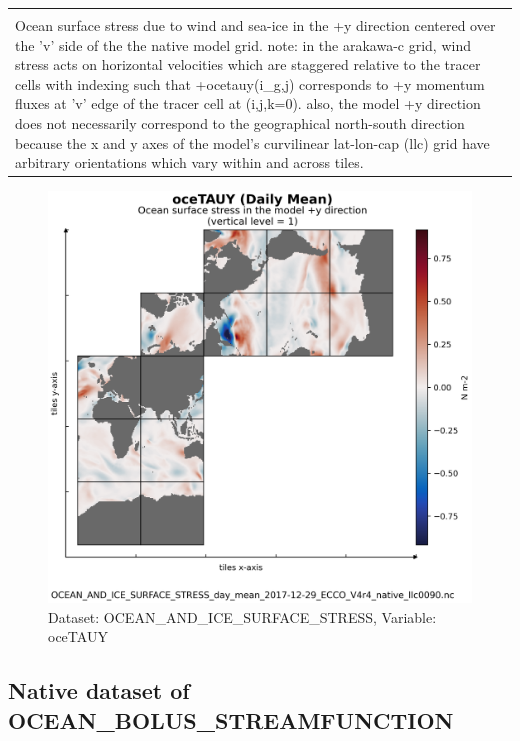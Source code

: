 \begin{longtable}{|m{}|m{}|m{}|m{}|}
{{{{{}}}}} \\ \hline
\rowcolor{lightgray} \multicolumn{4}{|c|}{\textbf{Comments}} \\ \hline
\multicolumn{4}{|p{1\textwidth}|}{\footnotesize{{Ocean surface stress due to wind and sea-ice in the +y direction centered over the 'v' side of the the native model grid. note: in the arakawa-c grid, wind stress acts on horizontal velocities which are staggered relative to the tracer cells with indexing such that +ocetauy(i\_g,j) corresponds to +y momentum fluxes at 'v' edge of the tracer cell at (i,j,k=0). also, the model +y direction does not necessarily correspond to the geographical north-south direction because the x and y axes of the model's curvilinear lat-lon-cap (llc) grid have arbitrary orientations which vary within and across tiles.}}} \\ \hline
\end{longtable}

\begin{figure}[H]
\centering
\includegraphics[scale=0.55]{../images/plots/v4r4/native_plots/Ocean_and_Sea-Ice_Surface_Stress/oceTAUY.png}
\caption{Dataset: OCEAN\_AND\_ICE\_SURFACE\_STRESS, Variable: oceTAUY}
\label{tab:table-OCEAN_AND_ICE_SURFACE_STRESS_oceTAUY-Plot}
\end{figure}
\newpage
\subsection{Native dataset of OCEAN\_BOLUS\_STREAMFUNCTION}
\newp
